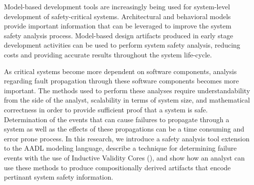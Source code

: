 Model-based development tools are increasingly being used for system-level development of safety-critical systems. Architectural and behavioral models  provide important information that can be leveraged to improve the system safety analysis process. Model-based design artifacts produced in early stage development activities can be used to perform system safety analysis, reducing costs and providing accurate results throughout the system life-cycle.

As critical systems become more dependent on software components, analysis regarding fault propagation through these software components becomes more important. The methods used to perform these analyses require understandability from the side of the analyst, scalability in terms of system size, and mathematical correctness in order to provide sufficient proof that a system is safe. Determination of the events that can cause failures to propagate through a system as well as the effects of these propagations can be a time consuming and error prone process. In this research, we introduce a safety analysis tool extension to the AADL modeling language, describe a technique for determining failure events with the use of Inductive Validity Cores (\ivc), and show how an analyst can use these methods to produce compositionally derived artifacts that encode pertinant system safety information.





